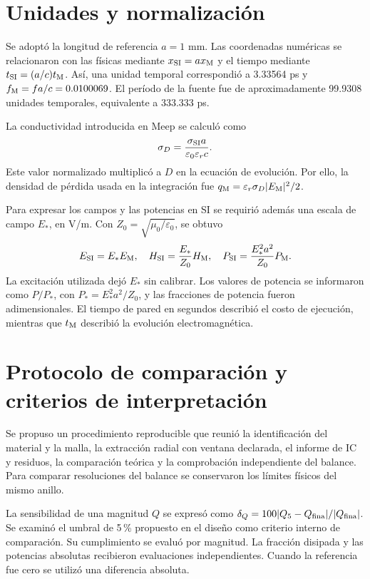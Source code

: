 \section{Unidades y normalización}\label{sec:unidades-campana}
Se adoptó la longitud de referencia $a=1$ mm. Las coordenadas numéricas se relacionaron con las físicas mediante $x_{\rm SI}=a x_{\rm M}$ y el tiempo mediante $t_{\rm SI}=(a/c)t_{\rm M}$. Así, una unidad temporal correspondió a 3.33564 ps y $f_{\rm M}=fa/c=0.0100069$. El período de la fuente fue de aproximadamente 99.9308 unidades temporales, equivalente a 333.333 ps.

La conductividad introducida en Meep se calculó como
\begin{equation}
 \sigma_D=\frac{\sigma_{\rm SI}a}{\varepsilon_0\varepsilon_r c}.
\end{equation}
Este valor normalizado multiplicó a $D$ en la ecuación de evolución. Por ello, la densidad de pérdida usada en la integración fue $q_{\rm M}=\varepsilon_r\sigma_D|E_{\rm M}|^2/2$.

Para expresar los campos y las potencias en SI se requirió además una escala de campo $E_*$, en V/m. Con $Z_0=\sqrt{\mu_0/\varepsilon_0}$, se obtuvo
\begin{equation}
 E_{\rm SI}=E_*E_{\rm M},\quad H_{\rm SI}=\frac{E_*}{Z_0}H_{\rm M},\quad P_{\rm SI}=\frac{E_*^2a^2}{Z_0}P_{\rm M}.
\end{equation}
La excitación utilizada dejó $E_*$ sin calibrar. Los valores de potencia se informaron como $P/P_*$, con $P_*=E_*^2a^2/Z_0$, y las fracciones de potencia fueron adimensionales. El tiempo de pared en segundos describió el costo de ejecución, mientras que $t_{\rm M}$ describió la evolución electromagnética.

\section{Protocolo de comparación y criterios de interpretación}
Se propuso un procedimiento reproducible que reunió la identificación del material y la malla, la extracción radial con ventana declarada, el informe de IC y residuos, la comparación teórica y la comprobación independiente del balance. Para comparar resoluciones del balance se conservaron los límites físicos del mismo anillo.

La sensibilidad de una magnitud $Q$ se expresó como $\delta_Q=100|Q_5-Q_{\rm fina}|/|Q_{\rm fina}|$. Se examinó el umbral de 5\,\% propuesto en el diseño como criterio interno de comparación. Su cumplimiento se evaluó por magnitud. La fracción disipada y las potencias absolutas recibieron evaluaciones independientes. Cuando la referencia fue cero se utilizó una diferencia absoluta.

